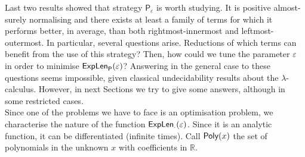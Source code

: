 Last two results showed that strategy $\mathsf{P}_\varepsilon$ is worth studying. It is positive almost-surely normalising and there exists at least a family of terms for which it performs better, in average, than both rightmost-innermost and leftmost-outermost. In particular, several questions arise. Reductions of which terms can benefit from the use of this strategy? Then, how could we tune the parameter $\varepsilon$ in order to minimise $\textsf{ExpLen}_{\mathsf{P}}(\varepsilon)$? Answering in the general case to these questions seems impossible, given classical undecidability results about the $\lambda$-calculus. However, in next Sections we try to give some answers, although in some restricted cases.\\
Since one of the problems we have to face is an optimisation problem, we characterise the nature of the function $\textsf{ExpLen}_{\cdot}(\varepsilon)$. Since it is an analytic function, it can be differentiated (infinite times). Call $\textsf{Poly}(x)$ the set of polynomials in the unknown $x$ with coefficients in $\mathbb{R}$.
